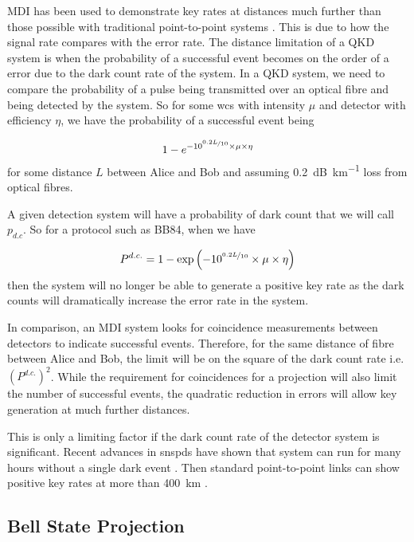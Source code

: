 \Ac{MDI} has been used to demonstrate key rates at distances much further than those possible with traditional point-to-point systems \cite{yin2016}. This is due to how the signal rate compares with the error rate. The distance limitation of a \ac{QKD} system is when the probability of a successful event becomes on the order of a error due to the dark count rate of the system. In a \ac{QKD} system, we  need to compare the probability of a pulse being transmitted over an optical fibre and being detected by the system. So for some \ac{wcs} with intensity $\mu$ and detector with efficiency $\eta$, we have the probability of a successful event being

\begin{equation}
	1 - e^{-10^{\nicefrac{0.2 L}{10}} \times \mu \times \eta}
\end{equation}
for some distance $L$ between Alice and Bob and assuming \SI{0.2}{dB\per\km} loss from optical fibres.

A given detection system will have a probability of dark count that we will call $p_{d.c}$. So for a protocol such as BB84, when we have

\begin{equation}
	P^{d.c.} = 1 - \exp\left(-10^{\nicefrac{0.2 L}{10}} \times \mu \times \eta\right)
\end{equation}
then the system will no longer be able to generate a positive key rate as the dark counts will dramatically increase the error rate in the system.

In comparison, an \ac{MDI} system looks for coincidence measurements between detectors to indicate successful events. Therefore, for the same distance of fibre between Alice and Bob, the limit will be on the square of the dark count rate i.e.  $(P^{d.c.})^2$. While the requirement for coincidences for a projection will also limit the number of successful events, the quadratic reduction in errors will allow key generation at much further distances.

This is only a limiting factor if the dark count rate of the detector system is significant. Recent advances in \acp{snspd} have shown that system can run for many hours without a single dark event \cite{wollman2017}. Then standard point-to-point links can show positive key rates at more than \SI{400}{\km} \cite{Boaron2018}.

\subsection{Bell State Projection}


